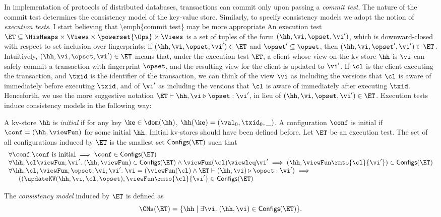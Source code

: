 In implementation of protocols of distributed databases, transactions can 
commit only upon passing a \emph{commit test}. 
The nature of the commit test determines the consistency model of 
the key-value store.
Similarly, to specify consistency models we adopt the notion of 
\emph{execution tests}. 
\ac{I start believing that \emph{commit test} may be more appropriate}
An execution test 
$\ET \subseteq \HisHeaps \times \Views \times \powerset{\Ops} \times \Views$ 
is a set of tuples of the form $(\hh, \vi, \opset, \vi')$, 
which is downward-closed with respect to set inclusion over fingerprints: 
if $(\hh, \vi, \opset, \vi') \in \ET$ and $\opset' \subseteq \opset$, then 
$(\hh, \vi, \opset', \vi') \in \ET$.
Intuitively, 
$(\hh, \vi, \opset, \vi') \in \ET$ means that, under the execution test 
$\ET$, a client whose view on the kv-store $\hh$ is $\vi$ can safely 
commit a transaction with fingerprint $\opset$, and the resulting 
view for the client is updated to $\vi'$. If $\cl$ is the client executing 
the transaction, and $\txid$ is the identifier of the transaction, we can think of the view 
$\vi$ as including the versions that $\cl$ is aware of immediately before 
executing $\txid$, and of $\vi'$ as including the versions that $\cl$ is 
aware of immediately after executing $\txid$.
Henceforth, we use the more 
suggestive notation $\ET \vdash \hh, \vi \triangleright \opset : \vi'$, 
in lieu of $(\hh, \vi, \opset, \vi') \in \ET$.
Execution tests induce consistency models in the following way: 
\begin{definition}
\label{def:cm}
A kv-store $\hh$ is \emph{initial} if for any key $\ke \in \dom(\hh)$, 
$\hh(\ke) = (\val_0, \txid_0, \_)$. A configuration $\conf$ is 
initial  if $\conf = (\hh, \viewFun)$ for some initial $\hh$.
\ac{Initial kv-stores should have been defined before.}
Let $\ET$ be an execution test. The set of all configurations 
induced by $\ET$ is the smallest set $\mathsf{Configs}(\ET)$ 
such that 
\[
\begin{array}{l}
\forall \conf. \conf \text{ is initial} \implies \conf \in \mathsf{Configs}(\ET)\\
\forall \hh, \cl \viewFun,\vi'.\; (\hh, \viewFun) \in \mathsf{Configs}(\ET) \wedge \viewFun(\cl) \viewleq \vi' \implies (\hh, \viewFun\rmto{\cl}{\vi'}) \in \mathsf{Configs}(\ET)\\
\forall \hh, \cl, \viewFun, \opset, \vi, \vi'.\; \vi = (\viewFun(\cl) \wedge \ET \vdash (\hh, \vi) \triangleright \opset : \vi') \implies {}\\
\hspace{15pt}
((\updateKV(\hh, \vi, \cl, \opset), \viewFun\rmto{\cl}{\vi'} \in \mathsf{Configs}(\ET) 
\end{array}
\]

The \emph{consistency model} induced by $\ET$ is defined as 
\[
\CMs(\ET) = \{ \hh \mid \exists \vi.\; (\hh, \vi) \in \mathsf{Configs}(\ET) \}.
\]
\end{definition}

